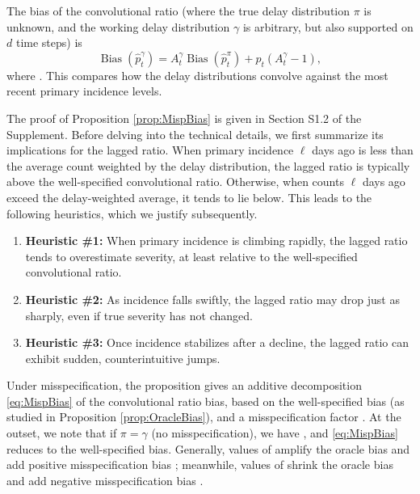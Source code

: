 \documentclass{article}
\renewcommand{\hat}{\widehat} %
\DeclareMathOperator{\bias}{Bias}
\begin{document}
\begin{proposition}
\label{prop:MispBias}
The bias of the convolutional ratio \smash{$\hat{p}_t^\gamma$} (where the true 
delay distribution $\pi$ is unknown, and the working delay distribution $\gamma$
is arbitrary, but also supported on $d$ time steps) is
\begin{equation}
\label{eq:MispBias}
\bias(\hat{p}_t^\gamma) = A_t^\gamma \bias(\hat{p}_t^\pi) + p_t (A_t^\gamma-1),  
\end{equation}
where . This compares how the delay distributions convolve against  
the most recent primary incidence levels. 
\end{proposition}

The proof of Proposition \ref{prop:MispBias} is given in 
Section S1.2 of the Supplement. 
Before delving into the technical details, we first summarize its implications for the lagged ratio.
When primary incidence $\ell$ days ago is less than the average count weighted by the delay distribution, 
the lagged ratio is typically above the well-specified convolutional ratio. 
Otherwise, when counts $\ell$ days ago exceed the delay-weighted average, 
it tends to lie below.
This leads to the following heuristics, which we justify subsequently.
\begin{enumerate}
    \item \textbf{Heuristic \#1:} When primary incidence is climbing rapidly, the lagged ratio tends to overestimate severity, at least relative to the well-specified convolutional ratio.
    \item \textbf{Heuristic \#2:} As incidence falls swiftly, the lagged ratio may drop just as sharply, even if true severity has not changed.
    \item \textbf{Heuristic \#3:} Once incidence stabilizes after a decline, the lagged ratio can exhibit sudden, counterintuitive jumps.
\end{enumerate}


Under misspecification, the proposition gives an
additive decomposition \eqref{eq:MispBias} of the convolutional ratio bias,
based on the well-specified bias \smash{$\bias(\hat{p}_t^\pi)$} (as studied in
Proposition \ref{prop:OracleBias}), and a misspecification factor
. At the outset, we note that if $\pi = \gamma$ (no  
misspecification), we have , and \eqref{eq:MispBias}
reduces to the well-specified bias. Generally, values of  amplify the oracle bias and add positive misspecification bias ; meanwhile, values of  shrink the
oracle bias and add negative misspecification bias . 
\end{document}
